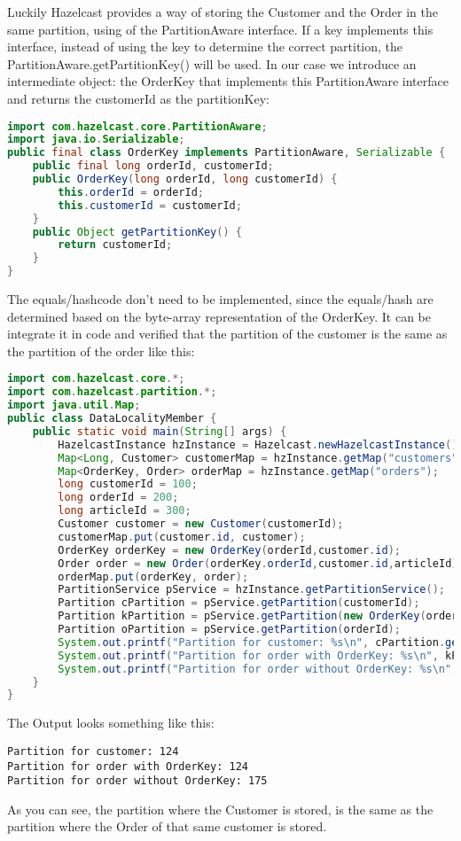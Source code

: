 Luckily Hazelcast provides a way of storing the Customer and the Order in the same partition, using of the PartitionAware interface. If a key implements this interface, instead of using the key to determine the correct partition, the PartitionAware.getPartitionKey() will be used. In our case we introduce an intermediate object: the OrderKey that implements this PartitionAware interface and returns the customerId as the partitionKey:
\begin{lstlisting}[language=java]
import com.hazelcast.core.PartitionAware;
import java.io.Serializable;
public final class OrderKey implements PartitionAware, Serializable {
    public final long orderId, customerId;
    public OrderKey(long orderId, long customerId) {
        this.orderId = orderId;
        this.customerId = customerId;
    }
    public Object getPartitionKey() {
        return customerId;
    }
}
\end{lstlisting}
The equals/hashcode don't need to be implemented, since the equals/hash are determined based on the byte-array representation of the OrderKey. It can be integrate it in code and verified that the partition of the customer is the same as the partition of the order like this:
\begin{lstlisting}[language=java]
import com.hazelcast.core.*;
import com.hazelcast.partition.*;
import java.util.Map;
public class DataLocalityMember {
    public static void main(String[] args) {
        HazelcastInstance hzInstance = Hazelcast.newHazelcastInstance();
        Map<Long, Customer> customerMap = hzInstance.getMap("customers");
        Map<OrderKey, Order> orderMap = hzInstance.getMap("orders");
        long customerId = 100;
        long orderId = 200;
        long articleId = 300;
        Customer customer = new Customer(customerId);
        customerMap.put(customer.id, customer);
        OrderKey orderKey = new OrderKey(orderId,customer.id);
        Order order = new Order(orderKey.orderId,customer.id,articleId);
        orderMap.put(orderKey, order);
        PartitionService pService = hzInstance.getPartitionService();
        Partition cPartition = pService.getPartition(customerId);
        Partition kPartition = pService.getPartition(new OrderKey(orderId, customerId));
        Partition oPartition = pService.getPartition(orderId);
        System.out.printf("Partition for customer: %s\n", cPartition.getPartitionId());
        System.out.printf("Partition for order with OrderKey: %s\n", kPartition.getPartitionId());
        System.out.printf("Partition for order without OrderKey: %s\n", oPartition.getPartitionId());
    }
}
\end{lstlisting}
The Output looks something like this:
\begin{lstlisting}
Partition for customer: 124
Partition for order with OrderKey: 124
Partition for order without OrderKey: 175
\end{lstlisting}
As you can see, the partition where the Customer is stored, is the same as the partition where the Order of that same customer is stored. 

